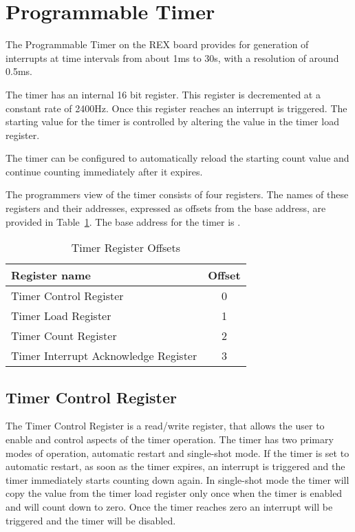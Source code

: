 \documentclass[a4paper,10pt]{article}
\begin{document}
\newpage
\appendix
\section{Programmable Timer}
\label{appen:timer}

The Programmable Timer on the REX board provides for generation of
interrupts at time intervals from about 1ms to 30s, with a resolution
of around 0.5ms.

The timer has an internal 16 bit register. This register is
decremented at a constant rate of 2400Hz. Once this register reaches
 an interrupt is triggered. The starting value for the
timer is controlled by altering the value in the timer load register.

The timer can be configured to automatically reload the starting count
value and continue counting immediately after it expires.

The programmers view of the timer consists of four registers.  The
names of these registers and their addresses, expressed as offsets
from the base address, are provided in
Table~\ref{table:timer_offsets}.  The base address for the timer is
\src{\LOCTIMEBASE}.

\begin{table}[h]
\begin{center}
\begin{tabular}{|l|c|}
\hline
\textbf{Register name} & \textbf{Offset} \\
\hline
Timer Control Register & 0 \\
\hline
Timer Load Register & 1 \\
\hline
Timer Count Register & 2 \\
\hline
Timer Interrupt Acknowledge Register & 3 \\
\hline
\end{tabular}
\caption{Timer Register Offsets}
\label{table:timer_offsets}
\end{center}
\end{table}


\subsection{Timer Control Register}

The Timer Control Register is a read/write register, that allows the
user to enable and control aspects of the timer operation. The timer
has two primary modes of operation, automatic restart and single-shot
mode. If the timer is set to automatic restart, as soon as the timer
expires, an interrupt is triggered and the timer immediately starts
counting down again. In single-shot mode the timer will copy the value
from the timer load register only once when the timer is enabled and
will count down to zero. Once the timer reaches zero an interrupt will
be triggered and the timer will be disabled.
\end{document}
